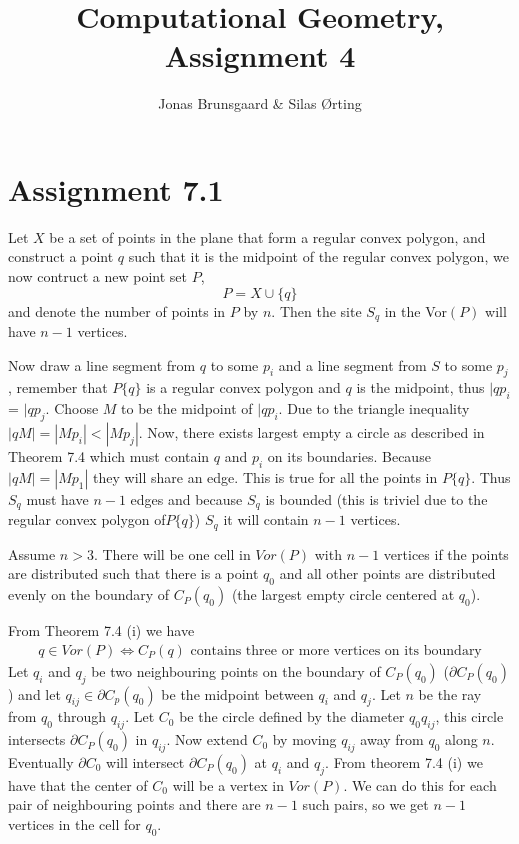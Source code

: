 \documentclass[10pt,a4paper,final,oneside,openany,article,oldfontcommands]{memoir}
\title{Computational Geometry, Assignment 4}
\author{
    Jonas Brunsgaard \& Silas Ørting
}
\begin{document}
\maketitle


\chapter*{Assignment 7.1}

Let $X$ be a set of points in the plane that form a regular convex polygon,
and construct a point $q$ such that it is the midpoint of the regular convex
polygon, we now contruct a new point set $P$, $$ P=X \cup \{q\} $$ and denote
the number of points in $P$ by $n$.
Then the site $S_q$ in the Vor$(P)$ will have $n-1$ vertices.

Now draw a line segment from $q$ to some $p_i$ and a line segment from $S$ to
some $p_j$, remember that $P\{q\}$ is a regular convex polygon and $q$ is the
midpoint, thus $|qp_i$ = $|qp_j$. Choose $M$ to be the midpoint of $|qp_i$.
Due to the triangle inequality $|qM| = |Mp_i| < |Mp_j|$. Now, there exists
largest empty a circle as described in Theorem 7.4 which must contain $q$ and
$p_i$ on its boundaries. Because $|qM|=|Mp_1|$ they will share an edge. This
is true for all the points in $P\{q\}$. Thus $S_q$ must have $n-1$ edges and
because $S_q$ is bounded (this is triviel due to the regular convex polygon
of$P\{q\}$) $S_q$ it will contain $n-1$ vertices.


Assume $n > 3$. There will be one cell in $Vor(P)$ with $n-1$ vertices if the
points are distributed such that there is a point $q_0$ and all other points
are distributed evenly on the boundary of $C_P(q_0)$ (the largest empty circle
centered at $q_0$). 

From Theorem 7.4 (i) we have
\begin{align*}
  q \in Vor(P) \iff C_P(q) \text{ contains three or more vertices on its boundary}
\end{align*}
Let $q_i$ and $q_j$ be two neighbouring points on the boundary of $C_P(q_0)$
($\partial C_P(q_0)$) and let $q_{ij} \in \partial C_p(q_0)$ be the midpoint
between $q_i$ and $q_j$. Let $n$ be the ray from $q_0$ through $q_{ij}$.
Let $C_0$ be the circle defined by the diameter $q_0q_{ij}$, this circle
intersects $\partial C_P(q_0)$ in $q_{ij}$. Now extend $C_0$ by moving
$q_{ij}$ away from $q_0$ along $n$. Eventually $\partial C_0$ will intersect
$\partial C_P(q_0)$ at $q_i$ and $q_j$. From theorem 7.4 (i) we have that the
center of $C_0$ will be a vertex in $Vor(P)$. We can do this for each pair of
neighbouring points and there are $n-1$ such pairs, so we get $n-1$ vertices
in the cell for $q_0$.
\end{document}

